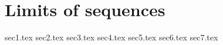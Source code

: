 \chapter{Limits of sequences}\label{i:ch:6}

{sec1.tex}
{sec2.tex}
{sec3.tex}
{sec4.tex}
{sec5.tex}
{sec6.tex}
{sec7.tex}
